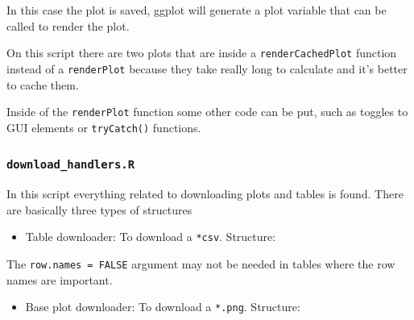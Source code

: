 \documentclass[
]{book}
\newenvironment{Shaded}{\begin{snugshade}}{\end{snugshade}}
\newcommand{\AttributeTok}[1]{\textcolor[rgb]{0.77,0.63,0.00}{#1}}
\newcommand{\ConstantTok}[1]{\textcolor[rgb]{0.00,0.00,0.00}{#1}}
\newcommand{\ControlFlowTok}[1]{\textcolor[rgb]{0.13,0.29,0.53}{\textbf{#1}}}
\newcommand{\FunctionTok}[1]{\textcolor[rgb]{0.00,0.00,0.00}{#1}}
\newcommand{\NormalTok}[1]{#1}
\newcommand{\OtherTok}[1]{\textcolor[rgb]{0.56,0.35,0.01}{#1}}
\newcommand{\SpecialCharTok}[1]{\textcolor[rgb]{0.00,0.00,0.00}{#1}}
\newcommand{\StringTok}[1]{\textcolor[rgb]{0.31,0.60,0.02}{#1}}
\providecommand{\tightlist}{%
  \setlength{\itemsep}{0pt}\setlength{\parskip}{0pt}}
\begin{document}
In this case the plot is saved, ggplot will generate a plot variable that can be called to render the plot.

On this script there are two plots that are inside a \texttt{renderCachedPlot} function instead of a \texttt{renderPlot} because they take really long to calculate and it's better to cache them.

Inside of the \texttt{renderPlot} function some other code can be put, such as toggles to GUI elements or \texttt{tryCatch()} functions.

\hypertarget{download_handlers.r}{%
\subsubsection{\texorpdfstring{\texttt{download\_handlers.R}}{download\_handlers.R}}\label{download_handlers.r}}

In this script everything related to downloading plots and tables is found. There are basically three types of structures

\begin{itemize}
\tightlist
\item
  Table downloader: To download a \texttt{*csv}. Structure:
\end{itemize}

\begin{Shaded}
\end{Shaded}

The \texttt{row.names\ =\ FALSE} argument may not be needed in tables where the row names are important.

\begin{itemize}
\tightlist
\item
  Base plot downloader: To download a \texttt{*.png}. Structure:
\end{itemize}

\begin{Shaded}
\end{Shaded}
\end{document}
